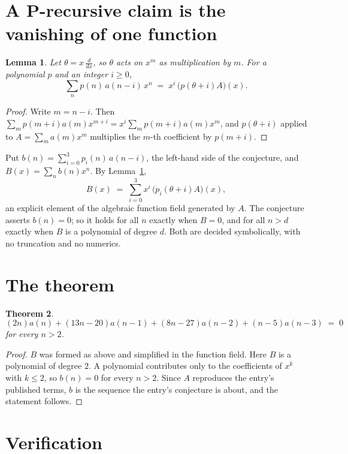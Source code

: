\documentclass[11pt,a4paper]{article}
\theoremstyle{plain}
\newtheorem{theorem}{Theorem}
\newtheorem{lemma}[theorem]{Lemma}
\theoremstyle{definition}
\begin{document}
\section{A P-recursive claim is the vanishing of one function}

\begin{lemma}\label{lem:theta}
Let $\theta=x\,\frac{d}{dx}$, so $\theta$ acts on $x^m$ as multiplication by $m$. For a
polynomial $p$ and an integer $i\ge0$,
\[
\sum_{n} p(n)\,a(n-i)\,x^{n}\;=\;x^{i}\,\bigl(p(\theta+i)A\bigr)(x).
\]
\end{lemma}

\begin{proof}
Write $m=n-i$. Then $\sum_m p(m+i)a(m)x^{m+i}=x^i\sum_m p(m+i)a(m)x^m$, and $p(\theta+i)$
applied to $A=\sum_m a(m)x^m$ multiplies the $m$-th coefficient by $p(m+i)$.
\end{proof}

Put $b(n)=\sum_{i=0}^{3}p_i(n)\,a(n-i)$, the left-hand side of the conjecture, and
$B(x)=\sum_n b(n)x^n$. By Lemma~\ref{lem:theta},
\[
B(x)\;=\;\sum_{i=0}^{3}x^{i}\,\bigl(p_i(\theta+i)A\bigr)(x),
\]
an explicit element of the algebraic function field generated by $A$. The conjecture asserts
$b(n)=0$; so it holds for all $n$ exactly when $B=0$, and for all $n>d$ exactly when $B$ is a
polynomial of degree $d$. Both are decided symbolically, with no truncation and no numerics.

\section{The theorem}

\begin{theorem}
\[
\left(2 n\right)a(n) + \left(13 n - 20\right)a(n-1) + \left(8 n - 27\right)a(n-2) + \left(n - 5\right)a(n-3)\;=\;0
\]
for every $n>2$.
\end{theorem}

\begin{proof}
$B$ was formed as above and simplified in the function field. Here $B$ is a polynomial of degree $2$. A polynomial contributes only to the coefficients of $x^k$ with $k\le2$, so $b(n)=0$ for every $n>2$. Since $A$ reproduces the
entry's published terms, $b$ is the sequence the entry's conjecture is about, and the statement
follows.
\end{proof}

\section{Verification}
\end{document}

